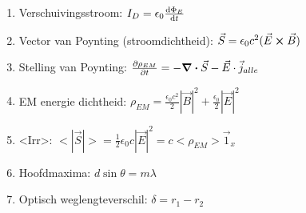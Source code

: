 \documentclass[12pt]{article}
\begin{document}
\begin{enumerate}
	    \item Verschuivingsstroom: $ I_D = \epsilon_0 \dv{\Phi_E}{t} $
	    \item Vector van Poynting (stroomdichtheid): $ \vec{S} = \epsilon_0 c^2 (\vec{E}\cross\vec{B})$
	    \item Stelling van Poynting: $ \pdv{\rho_{EM}}{t} = -\div \vec{S} - \vec{E} \cdot \vec{j}_{alle} $
	    \item EM energie dichtheid: $ \rho_{EM} = \frac{\epsilon_0 c^2}{2}|\vec{B}|^2 + \frac{\epsilon_0}{2}|\vec{E}|^2 $
	    \item <Irr>: $ <|\vec{S}|> = \frac{1}{2} \epsilon_0 c |\vec{E}|^2 = c <\rho_{EM}> \vec{1}_x $
	    \item Hoofdmaxima: $ d \sin\theta = m\lambda $
	    \item Optisch weglengteverschil: $ \delta = r_1 - r_2 $
    \end{enumerate}
\end{document}
